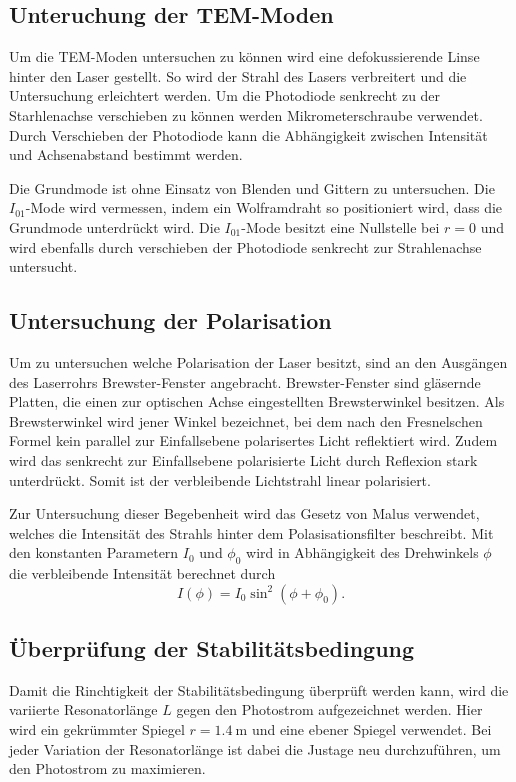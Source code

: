 \subsection{Unteruchung der TEM-Moden}
Um die TEM-Moden untersuchen zu können wird eine defokussierende Linse hinter den Laser gestellt.
So wird der Strahl des Lasers verbreitert und die Untersuchung erleichtert werden.
Um die Photodiode senkrecht zu der Starhlenachse verschieben zu können werden
Mikrometerschraube verwendet. Durch Verschieben der Photodiode kann die Abhängigkeit
zwischen Intensität und Achsenabstand bestimmt werden.

Die Grundmode ist ohne Einsatz von Blenden und Gittern zu untersuchen. Die
$I_{01}$-Mode wird vermessen, indem ein Wolframdraht so positioniert wird, dass
die Grundmode unterdrückt wird. Die $I_{01}$-Mode besitzt eine Nullstelle bei $r = 0$
und wird ebenfalls durch verschieben der Photodiode senkrecht zur Strahlenachse
untersucht.

\subsection{Untersuchung der Polarisation}
Um zu untersuchen welche Polarisation der Laser besitzt, sind an den Ausgängen des
Laserrohrs Brewster-Fenster angebracht. Brewster-Fenster sind gläsernde Platten, die einen
zur optischen Achse eingestellten Brewsterwinkel besitzen. Als Brewsterwinkel wird
jener Winkel bezeichnet, bei dem nach den Fresnelschen Formel kein parallel zur
Einfallsebene polarisertes Licht reflektiert wird. Zudem wird das senkrecht zur
Einfallsebene polarisierte Licht durch Reflexion stark unterdrückt. Somit ist der
verbleibende Lichtstrahl linear polarisiert.

Zur Untersuchung dieser Begebenheit wird das Gesetz von Malus verwendet, welches
die Intensität des Strahls hinter dem Polasisationsfilter beschreibt. Mit
den konstanten Parametern $I_0$ und $\phi_0$ wird in Abhängigkeit des Drehwinkels
$\phi$ die verbleibende Intensität berechnet durch
\begin{equation}
  I(\phi) = I_0\sin^2(\phi+\phi_0).
\end{equation}

\subsection{Überprüfung der Stabilitätsbedingung}
Damit die Rinchtigkeit der Stabilitätsbedingung überprüft werden kann, wird die
variierte Resonatorlänge $L$ gegen den Photostrom aufgezeichnet werden. Hier
wird ein gekrümmter Spiegel $r=\SI{1.4}{\metre}$ und eine ebener Spiegel verwendet.
Bei jeder Variation der Resonatorlänge ist dabei die Justage neu durchzuführen,
um den Photostrom zu maximieren.
